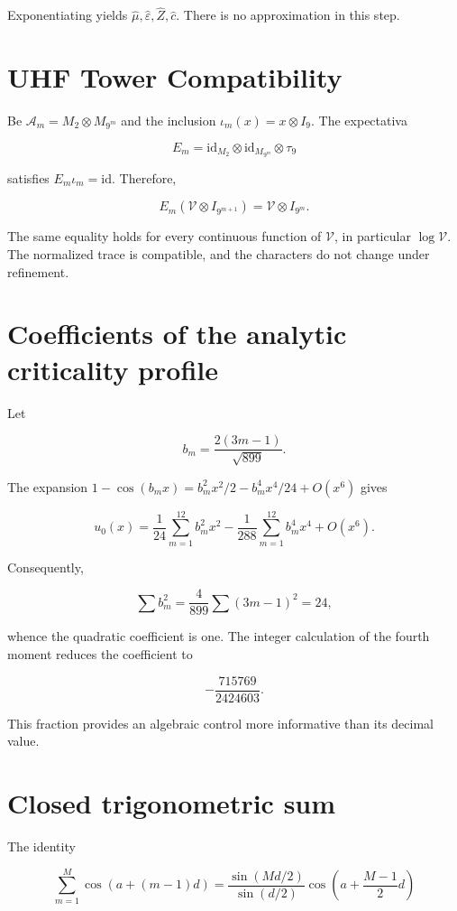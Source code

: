 Exponentiating yields \(\widehat\mu,\widehat\varepsilon,\widehat Z,\widehat c\). There is no approximation in this step.

\section{UHF Tower Compatibility}

Be \(\mathcal A_m=M_2\otimes M_{9^m}\) and the inclusion \(\iota_m(x)=x\otimes I_9\). The expectativa

\[
E_m=\mathrm{id}_{M_2}\otimes\mathrm{id}_{M_{9^m}}\otimes\tau_9
\]

satisfies \(E_m\iota_m=\mathrm{id}\). Therefore,

\[
E_m(\mathcal V\otimes I_{9^{m+1}})
=\mathcal V\otimes I_{9^m}.
\]

The same equality holds for every continuous function of \(\mathcal V\), in particular \(\log\mathcal V\). The normalized trace is compatible, and the characters do not change under refinement.

\section{Coefficients of the analytic criticality profile}

Let

\[
b_m=\frac{2(3m-1)}{\sqrt{899}}.
\]

The expansion \(1-\cos(b_mx)=b_m^2x^2/2-b_m^4x^4/24+O(x^6)\) gives

\[
u_0(x)=\frac1{24}\sum_{m=1}^{12}b_m^2x^2
-\frac1{288}\sum_{m=1}^{12}b_m^4x^4+O(x^6).
\]

Consequently,

\[
\sum b_m^2=\frac4{899}\sum(3m-1)^2=24,
\]

whence the quadratic coefficient is one. The integer calculation of the fourth moment reduces the coefficient to

\[
-\frac{715769}{2424603}.
\]

This fraction provides an algebraic control more informative than its
decimal value.

\section{Closed trigonometric sum}

The identity

\[
\sum_{m=1}^{M}\cos(a+(m-1)d)
=\frac{\sin(Md/2)}{\sin(d/2)}
\cos\!\left(a+\frac{M-1}{2}d\right)
\]

